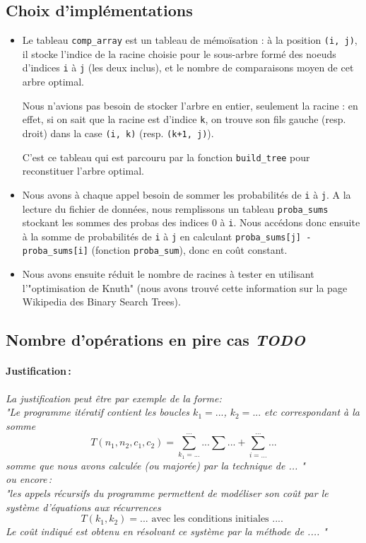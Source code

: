 \documentclass[a4paper, 10pt, french]{article}
\begin{document}
 \subsection{Choix d'implémentations}
 \begin{itemize}
	 \item Le tableau \verb?comp_array? est un tableau de mémoïsation : à la position \verb?(i, j)?, il stocke l'indice de la racine choisie pour le sous-arbre formé des noeuds d'indices \verb?i? à \verb?j? (les deux inclus), et le nombre de comparaisons moyen de cet arbre optimal.

		 Nous n'avions pas besoin de stocker l'arbre en entier, seulement la racine : en effet, si on sait que la racine est d'indice \verb?k?, on trouve son fils gauche (resp. droit) dans la case \verb?(i, k)? (resp. \verb?(k+1, j)?).

		 C'est ce tableau qui est parcouru par la fonction \verb?build_tree? pour reconstituer l'arbre optimal.

	 \item Nous avons à chaque appel besoin de sommer les probabilités de \verb?i? à \verb?j?. A la lecture du fichier de données, nous remplissons un tableau \verb?proba_sums? stockant les sommes des probas des indices 0 à \verb?i?.
		 Nous accédons donc ensuite à la somme de probabilités de \verb?i? à \verb?j? en calculant \verb?proba_sums[j] - proba_sums[i]? (fonction \verb?proba_sum?), donc en coût constant.

	 \item Nous avons ensuite réduit le nombre de racines à tester en utilisant l'"optimisation de Knuth" (nous avons trouvé cette information sur la page Wikipedia des Binary Search Trees).
 \end{itemize}

  \subsection{Nombre  d'opérations en pire cas \em TODO}
	\paragraph{Justification\,: }
	{\em La justification peut être par exemple de la forme: \\ 
	   "Le programme itératif contient les boucles $k_1=...$, $k_2= ...$ etc correspondant à la somme 
	  $$T(n_1, n_2, c_1, c_2) = \sum_{k_1=...}^{...} ... \sum ... + \sum_{i=...}^{...} ...$$ 
	  somme que nous avons calculée (ou majorée) par la technique de  ... " \\
	  ou  encore\,:  \\
	  "les appels récursifs du programme permettent de modéliser son coût par le système d'équations aux récurrences 
	  $$T(k_1, k_2) = ...  \mbox{~avec~les~conditions~initiales~....~} $$
	  Le coût indiqué est obtenu en résolvant ce système par la méthode de  .... "
	} 
\end{document}
